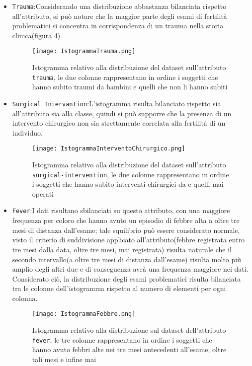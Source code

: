 \begin{itemize}
	\item \texttt{Trauma}:Considerando una distribuzione abbastanza bilanciata rispetto all'attributo, si può notare che la maggior parte degli esami di fertilità problematici si concentra in corrispondenza di un trauma nella storia clinica(figura 4)	
	
		\begin{figure}[H]
		\texttt{[image: IstogrammaTrauma.png]}
		\caption{Istogramma relativo alla distribuzione del dataset sull'attributo \texttt{trauma}, le due colonne rappresentano in ordine i soggetti che hanno subito traumi da bambini e quelli che non li hanno subiti}
	\end{figure}
	
	\item \texttt{Surgical Intervantion}:L'istogramma risulta bilanciato rispetto sia all'attributo sia alla classe, quindi si può supporre che la presenza di un intervento chirurgico non sia strettamente correlata alla fertilità di un individuo.
	
	\begin{figure}[H]
		\texttt{[image: IstogrammaInterventoChirurgico.png]}
		\caption{Istogramma relativo alla distribuzione del dataset sull'attributo \texttt{surgical-intervention}, le due colonne rappresentano in ordine i soggetti che hanno subito interventi chirurgici da e quelli mai operati}
	\end{figure}
	
	\item \texttt{Fever}:I dati risultano sbilanciati su questo attributo, con una maggiore frequenza per coloro che hanno avuto un episodio di febbre alta a oltre tre mesi di distanza dall'esame; tale squilibrio può essere considerato normale, visto il criterio di suddivisione applicato all'attributo(febbre registrata entro tre mesi dalla data, oltre tre mesi, mai registrata) risulta naturale che il secondo intervallo(a oltre tre mesi di distanza dall'esame) risulta molto più amplio degli altri due e di conseguenza avrà una frequenza maggiore nei dati.
	Considerato ciò, la distribuzione degli esami problematici risulta bilanciata tra le colonne dell'istogramma rispetto al numero di elementi per ogni colonna. 
	
	\begin{figure}[H]
		\texttt{[image: IstogrammaFebbre.png]}
		\caption{Istogramma relativo alla distribuzione sul dataset dell'attributo \texttt{fever}, le tre colonne rappresentano in ordine i soggetti che hanno avuto febbri alte nei tre mesi antecedenti all'esame, oltre tali mesi e infine mai}
	\end{figure}
	

\end{itemize}
